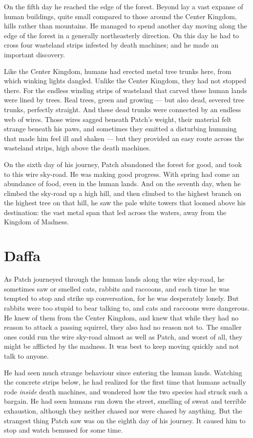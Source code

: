 \documentclass[12pt]{book}
\begin{document}
On the fifth day he reached the edge of the forest. Beyond lay a vast
expanse of human buildings, quite small compared to those around the
Center Kingdom, hills rather than mountains. He managed to spend
another day moving along the edge of the forest in a generally
northeasterly direction. On this day he had to cross four wasteland
strips infested by death machines; and he made an important discovery.

Like the Center Kingdom, humans had erected metal tree trunks here,
from which winking lights dangled. Unlike the Center Kingdom, they had
not stopped there. For the endless winding strips of wasteland that
carved these human lands were lined by trees. Real trees, green and
growing --- but also dead, severed tree trunks, perfectly
straight. And these dead trunks were connected by an endless web of
wires. Those wires sagged beneath Patch's weight, their material felt
strange beneath his paws, and sometimes they emitted a disturbing
humming that made him feel ill and shaken --- but they provided an
easy route across the wasteland strips, high above the death machines.

On the sixth day of his journey, Patch abandoned the forest for good,
and took to this wire sky-road. He was making good progress. With
spring had come an abundance of food, even in the human lands. And on
the seventh day, when he climbed the sky-road up a high hill, and then
climbed to the highest branch on the highest tree on that hill, he saw
the pale white towers that loomed above his destination: the vast
metal span that led across the waters, away from the Kingdom of
Madness.


\section{Daffa}

As Patch journeyed through the human lands along the wire sky-road, he
sometimes saw or smelled cats, rabbits and raccoons, and each time he
was tempted to stop and strike up conversation, for he was desperately
lonely. But rabbits were too stupid to bear talking to, and cats and
raccoons were dangerous. He knew of them from the Center Kingdom, and
knew that while they had no reason to attack a passing squirrel, they
also had no reason not to. The smaller ones could run the wire
sky-road almost as well as Patch, and worst of all, they might be
afflicted by the madness. It was best to keep moving quickly and not
talk to anyone.

He had seen much strange behaviour since entering the human
lands. Watching the concrete strips below, he had realized for the
first time that humans actually rode \textit{inside} death machines,
and wondered how the two species had struck such a bargain. He had
seen humans run down the street, smelling of sweat and terrible
exhaustion, although they neither chased nor were chased by
anything. But the strangest thing Patch saw was on the eighth day of
his journey. It caused him to stop and watch bemused for some time.
\end{document}
